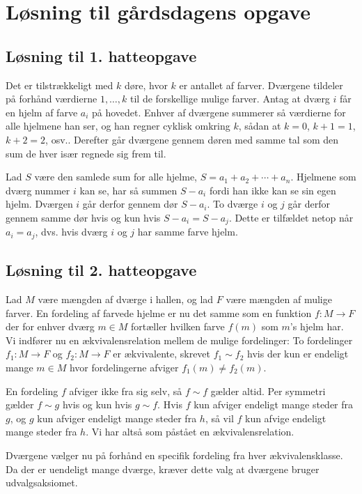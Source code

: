 \begin{minipage}[t]{100mm}
\vspace{3mm}
\section*{Løsning til gårdsdagens opgave}
\subsection*{Løsning til 1. hatteopgave}
Det er tilstrækkeligt med $k$ døre, hvor $k$ er antallet af farver. Dværgene tildeler på forhånd værdierne $1,\dotsc,k$ til de forskellige mulige farver. Antag at dværg $i$ får en hjelm af farve $a_i$ på hovedet. Enhver af dværgene summerer så værdierne for alle hjelmene han ser, og han regner cyklisk omkring $k$, sådan at $k=0$, $k+1=1$, $k+2=2$, osv.. Derefter går dværgene gennem døren med samme tal som den sum de hver især regnede sig frem til.

Lad $S$ være den samlede sum for alle hjelme, $S=a_1+a_2+\dotsb+a_n$. Hjelmene som dværg nummer $i$ kan se, har så summen $S-a_i$ fordi han ikke kan se sin egen hjelm. Dværgen $i$ går derfor gennem dør $S-a_i$. To dværge $i$ og $j$ går derfor gennem samme dør hvis og kun hvis $S-a_i=S-a_j$. Dette er tilfældet netop når $a_i=a_j$, dvs. hvis dværg $i$ og $j$ har samme farve hjelm.

\subsection*{Løsning til 2. hatteopgave}
Lad $M$ være mængden af dværge i hallen, og lad $F$ være mængden af mulige farver. En fordeling af farvede hjelme er nu det samme som en funktion $f\colon M\to F$ der for enhver dværg $m\in M$ fortæller hvilken farve $f(m)$ som $m$'s hjelm har. Vi indfører nu en ækvivalensrelation mellem de mulige fordelinger: To fordelinger $f_1\colon M\to F$ og $f_2\colon M\to F$ er ækvivalente, skrevet $f_1\sim f_2$ hvis der kun er endeligt mange $m\in M$ hvor fordelingerne afviger $f_1(m)\neq f_2(m)$.

En fordeling $f$ afviger ikke fra sig selv, så $f\sim f$ gælder altid. Per symmetri gælder $f\sim g$ hvis og kun hvis $g\sim f$. Hvis $f$ kun afviger endeligt mange steder fra $g$, og $g$ kun afviger endeligt mange steder fra $h$, så vil $f$ kun afvige endeligt mange steder fra $h$. Vi har altså som påstået en ækvivalensrelation.

Dværgene vælger nu på forhånd en specifik fordeling fra hver ækvivalensklasse. Da der er uendeligt mange dværge, kræver dette valg at dværgene bruger udvalgsaksiomet.


\end{minipage}
